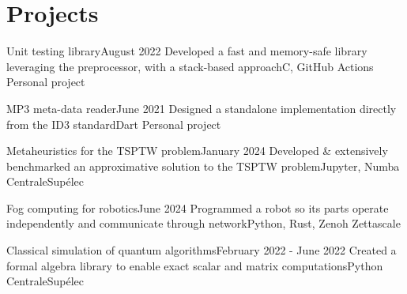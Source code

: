 \section{Projects}
\resumeSubHeadingListStart
    \resumeProjectHeading
    {Unit testing library}{\quad August 2022}
    {Developed a fast and memory-safe library leveraging the preprocessor, with a stack-based approach}{C, GitHub Actions}
    {}
    {Personal project}
    \vspace{-7pt}
    \resumeItemListStart
    \resumeItemListEnd

    \resumeProjectHeading
    {MP3 meta-data reader}{June 2021}
    {Designed a standalone implementation directly from the ID3 standard}{Dart}
    {}
    {Personal project}

    \resumeProjectHeading
    {Metaheuristics for the TSPTW problem}{January 2024}
    {Developed \& extensively benchmarked an approximative solution to the TSPTW problem}{Jupyter, Numba}
    {}
    {CentraleSupélec}

    \resumeProjectHeading
    {Fog computing for robotics}{June 2024}
    {Programmed a robot so its parts operate independently and communicate through network}{Python, Rust, Zenoh}
    {}
    {Zettascale}


    \resumeProjectHeading
    {Classical simulation of quantum algorithms}{February 2022 - June 2022}
    {Created a formal algebra library to enable exact scalar and matrix computations}{Python}
    {}
    {CentraleSupélec}
    \vspace{-7pt}
    \resumeItemListStart
    \resumeItemListEnd

\resumeSubHeadingListEnd
